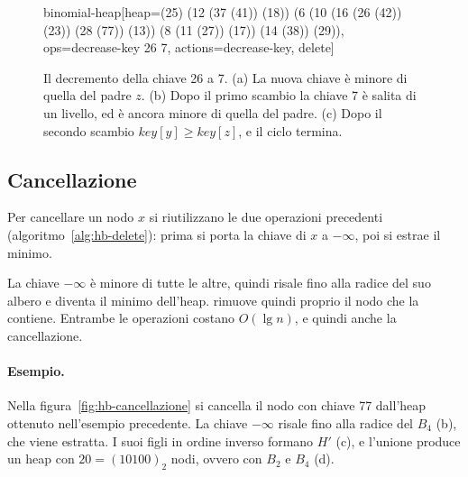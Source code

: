 \begin{figure}[htbp]
\begin{widget}{binomial-heap}[heap={(25) (12 (37 (41)) (18)) (6 (10 (16 (26 (42)) (23)) (28 (77)) (13)) (8 (11 (27)) (17)) (14 (38)) (29))}, ops={decrease-key 26 7}, actions={decrease-key, delete}]
\end{widget}
\caption{Il decremento della chiave 26 a 7. (a) La nuova chiave è minore di quella del padre $z$. (b) Dopo il primo scambio la chiave 7 è salita di un livello, ed è ancora minore di quella del padre. (c) Dopo il secondo scambio $\mathit{key}[y] \ge \mathit{key}[z]$, e il ciclo termina.}
\label{fig:hb-decremento}
\end{figure}

\subsection{Cancellazione}\label{sec:hb-delete}
Per cancellare un nodo $x$ si riutilizzano le due operazioni precedenti (algoritmo~\ref{alg:hb-delete}): prima si porta la chiave di $x$ a $-\infty$, poi si estrae il minimo.

\begin{algorithm}[htbp]
\caption{La cancellazione del nodo $x$: con la chiave $-\infty$, $x$ diventa il minimo dell'heap.}\label{alg:hb-delete}
\begin{algorithmic}[1]
  \State {}
  \State {}
\EndProcedure
\end{algorithmic}
\end{algorithm}

La chiave $-\infty$ è minore di tutte le altre, quindi risale fino alla radice del suo albero e diventa il minimo dell'heap. \BinomialHeapExtractMin{} rimuove quindi proprio il nodo che la contiene. Entrambe le operazioni costano $O(\lg n)$, e quindi anche la cancellazione.

\paragraph{Esempio.}
Nella figura~\ref{fig:hb-cancellazione} si cancella il nodo con chiave 77 dall'heap ottenuto nell'esempio precedente. La chiave $-\infty$ risale fino alla radice del $B_4$ (b), che viene estratta. I suoi figli in ordine inverso formano $H'$ (c), e l'unione produce un heap con $20 = (10100)_2$ nodi, ovvero con $B_2$ e $B_4$ (d).

